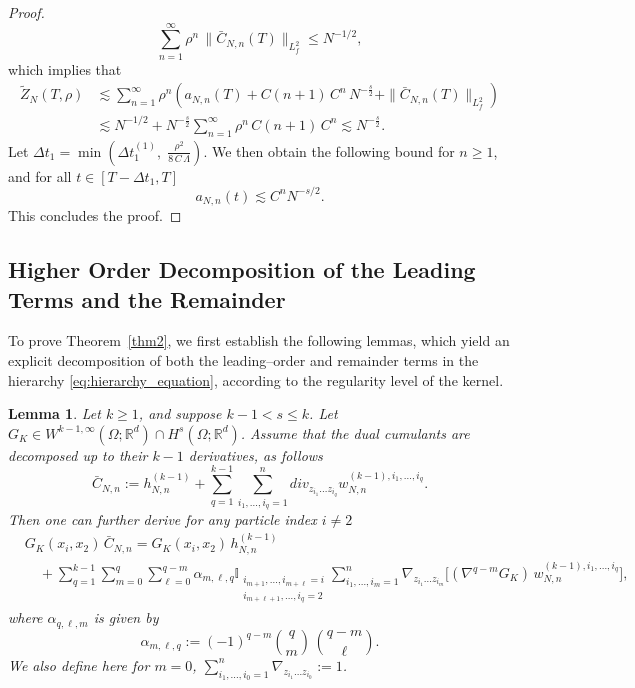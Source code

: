 \documentclass[pdflatex,sn-mathphys-num]{sn-jnl}
\theoremstyle{thmstyleone}%
\theoremstyle{thmstyletwo}%
\theoremstyle{thmstylethree}%
\newtheorem{lemma}{Lemma}
\begin{document}
\begin{proof}
\[
\sum_{n=1}^\infty \rho^n\,\|\bar C_{N,n}(T)\|_{L^2_f}\leq N^{-1/2},
\]
which implies that 
\begin{align*}
\widetilde{Z}_{N}(T, \rho) 
&\lesssim \sum_{n=1}^\infty \rho^n \left(  a_{N,n}(T) 
+ C(n+1)\,C^n\, N^{-\frac{s}{2}} +\|\bar C_{N,n}(T)\|_{L^2_f}  \right) \\
&\lesssim N^{-1/2} +  N^{-\frac{s}{2}}\sum_{n=1}^\infty \rho^n\, C(n+1)\,C^n \lesssim N^{-\frac{s}{2}}.
\end{align*}
Let \( \Delta t_1 =\min\left(\Delta t_1^{(1)},\;\frac{\rho^2}{8\,C\,\Lambda}\right)\). We then obtain the following bound for $n \geq 1$, and for all \(t \in [T-\Delta t_1,T]\)
\[
a_{N,n}(t)\lesssim C^n N^{-s/2}.
\]
This concludes the proof.
\end{proof}



\subsection{Higher Order Decomposition of the Leading Terms and the Remainder}
To prove Theorem~\ref{thm2}, we first establish the following lemmas, which yield an explicit decomposition of both the leading--order and remainder terms in the hierarchy \eqref{eq:hierarchy_equation}, according to the regularity level of the kernel.
\begin{lemma}\label{eq:lemma1}
Let \( k \geq 1 \), and suppose \( k - 1 < s \leq k \). Let \( G_K \in W^{k-1,\infty}(\Omega ; \mathbb{R}^d) \cap H^{s}(\Omega; \mathbb{R}^d) \). 
Assume that the dual cumulants are decomposed up to their \(k-1\) derivatives, as follows
\[
\bar{C}_{N,n} := h^{(k-1)}_{N,n}+\sum_{q=1}^{k-1} \sum_{i_1,\ldots,i_q=1}^n div_{z_{i_1}\ldots z_{i_q}} w^{(k-1),i_1,\ldots,i_q}_{N,n}.
\]
Then one can further derive for any particle index $i\neq 2$
\begin{align*}
& G_K(x_i,x_2)\,\bar{C}_{N,n}=G_K(x_i,x_2)\,h_{N,n}^{(k-1)}\\
&\quad +
\sum_{q=1}^{k-1} \sum_{m=0}^{q}\sum_{\ell=0}^{q-m} \alpha_{m,\ell,q} \mathbb{I}_{\substack{i_{m+1},\ldots, i_{m+\ell}=i \\ i_{m+\ell+1},\ldots,i_q=2}}
\sum_{i_1,\ldots,i_{m}=1}^{n} \nabla_{z_{i_1}\dots z_{i_{m}}}
\Big[
(\nabla^{q-m} G_K)\,
w_{N,n}^{(k-1),i_1,\ldots,i_{q}}
\Big] ,
\end{align*}
where $\alpha_{q,\ell,m}$ is given by
\[
\alpha_{m,\ell,q} := (-1)^{q-m} \binom{q}{m}\,\binom{q-m}{\ell}.
\]
We also define here for $m=0$, $ \sum_{i_1,\ldots,i_{0}=1}^{n} 
\nabla_{z_{i_1}\dots z_{i_{0}}}:=1$. 
 \end{lemma}
\end{document}

